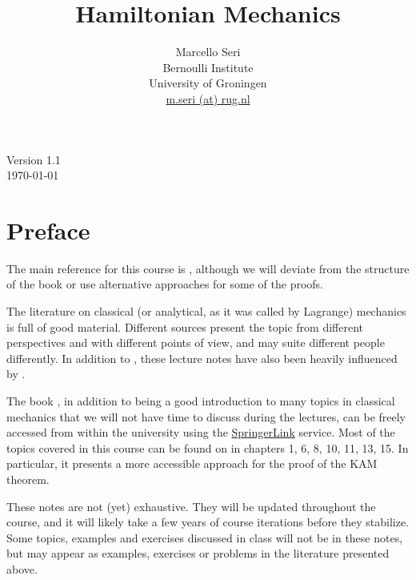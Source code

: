 \documentclass[english,fontsize=11pt,paper=a5,oneside]{scrbook}
\title{Hamiltonian Mechanics}
\author{Marcello Seri\\
\small{Bernoulli Institute}\vspace{-.2cm}\\
\small{University of Groningen}\vspace{-.2cm}\\
\small\href{mailto:m.seri@rug.nl}{m.seri (at) rug.nl}
}
\date{}
\theoremstyle{definition}
\def\biblio{}
\begin{document}
\def\biblio{}

\maketitle

\cleardoublepage

\thispagestyle{empty}
\null\vfill
\begin{center}
    Version 1.1\\
    \today
\end{center}
\vfill
\small{\doclicenseThis}

\cleardoublepage

\tableofcontents

\cleardoublepage

\chapter*{Preface}

The main reference for this course is \cite{book:arnold}, although we will deviate from the structure of the book or use alternative approaches for some of the proofs.

The literature on classical (or analytical, as it was called by Lagrange) mechanics is full of good material.
Different sources present the topic from different perspectives and with different points of view, and may suite different people differently.
In addition to \cite{book:arnold}, these lecture notes have also been heavily influenced by \cite{book:knauf,lectures:dubrovin,book:lowenstein,book:marsdenratiu,lectures:tong,book:sicm}.

The book \cite{book:knauf}, in addition to being a good introduction to many topics in classical mechanics that we will not have time to discuss during the lectures, can be freely accessed from within the university using the \href{https://link.springer.com/book/10.1007%2F978-3-662-55774-7}{SpringerLink} service.
Most of the topics covered in this course can be found on \cite{book:knauf} in chapters 1, 6, 8, 10, 11, 13, 15. In particular, it presents a more accessible approach for the proof of the KAM theorem.

These notes are not (yet) exhaustive.
They will be updated throughout the course, and it will likely take a few years of course iterations before they stabilize.
Some topics, examples and exercises discussed in class will not be in these notes, but may appear as examples, exercises or problems in the literature presented above.
\end{document}
